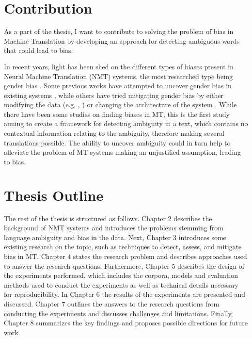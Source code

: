 
\section{Contribution}
\label{sec:Introduction:Contribution}

As a part of the thesis, I want to contribute to solving the problem of bias in Machine Translation by developing an approach for detecting ambiguous words that could lead to bias. 

In recent years, light has been shed on the different types of biases present in Neural Machine Translation (NMT) systems, the most researched type being gender bias \parencite{Savoldi_2021}. Some previous works have attempted to uncover gender bias in existing systems \parencite{Prates_2019}, while others have tried mitigating gender bias by either modifying the data (e.g, \citet{Escud_Font_2019}, \citet{Stanovsky_2019}) or changing the architecture of the system \parencite{Vanmassenhove_2018}. While there have been some studies on finding biases in MT, this is the first study aiming to create a framework for detecting ambiguity in a text, which contains no contextual information relating to the ambiguity, therefore making several translations possible. The ability to uncover ambiguity could in turn help to alleviate the problem of MT systems making an unjustified assumption, leading to bias.


\section{Thesis Outline}
\label{sec:Introduction:Outline}
The rest of the thesis is structured as follows. Chapter 2 describes the background of NMT systems and introduces the problems stemming from language ambiguity and bias in the data. Next, Chapter 3 introduces some existing research on the topic, such as techniques to detect, assess, and mitigate bias in MT. Chapter 4 states the research problem and describes approaches used to answer the research questions. Furthermore, Chapter 5 describes the design of the experiments performed, which includes the corpora, models and evaluation methods used to conduct the experiments as well as technical details necessary for reproducibility. In Chapter 6 the results of the experiments are presented and discussed. Chapter 7 outlines the answers to the research questions from conducting the experiments and discusses challenges and limitations. Finally, Chapter 8 summarizes the key findings and proposes possible directions for future work.